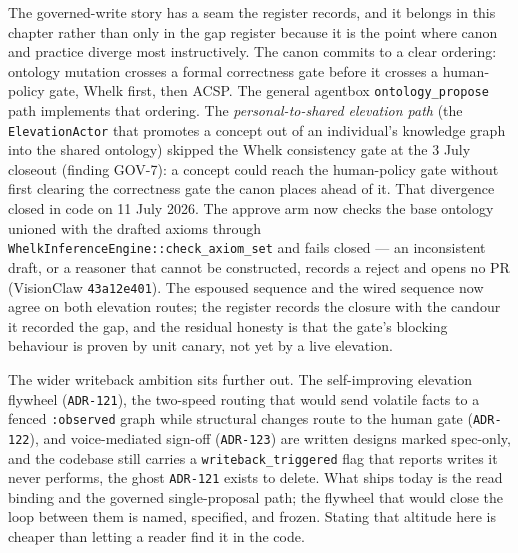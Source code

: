 The governed-write story has a seam the register records, and it belongs in this chapter
rather than only in the gap register because it is the point where canon and practice
diverge most instructively. The canon commits to a clear ordering: ontology mutation
crosses a formal correctness gate before it crosses a human-policy gate, Whelk first, then
ACSP. The general agentbox \texttt{ontology\_propose} path implements that ordering. The
\emph{personal-to-shared elevation path} (the \texttt{ElevationActor} that promotes a
concept out of an individual's knowledge graph into the shared ontology) skipped
the Whelk consistency gate at the 3 July closeout (finding GOV-7): a concept could
reach the human-policy gate without first clearing the correctness gate the canon
places ahead of it. That divergence closed in code on 11 July 2026. The approve arm now
checks the base ontology unioned with the drafted axioms through
\texttt{WhelkInferenceEngine::check\_axiom\_set} and fails closed --- an inconsistent draft,
or a reasoner that cannot be constructed, records a reject and opens no PR (VisionClaw
\texttt{43a12e401}). The espoused sequence and the wired sequence now agree on both
elevation routes; the register records the closure with the candour it recorded the gap,
and the residual honesty is that the gate's blocking behaviour is proven by unit canary,
not yet by a live elevation.

The wider writeback ambition sits further out. The self-improving elevation flywheel
(\texttt{ADR-121}), the two-speed routing that would send volatile facts to a fenced
\texttt{:observed} graph while structural changes route to the human gate (\texttt{ADR-122}),
and voice-mediated sign-off (\texttt{ADR-123}) are written designs marked spec-only, and the
codebase still carries a \texttt{writeback\_triggered} flag that reports writes it never
performs, the ghost \texttt{ADR-121} exists to delete. What ships today is the read binding
and the governed single-proposal path; the flywheel that would close the loop between them
is named, specified, and frozen. Stating that altitude here is cheaper than letting a reader
find it in the code.
